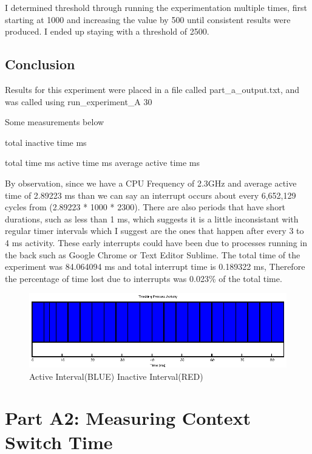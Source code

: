 \documentclass{article}
\begin{document}
I determined threshold through running the experimentation multiple times, first starting at 1000 and increasing the value by 500 until consistent results were produced. I ended up  staying with a threshold of 2500.

\subsection{Conclusion}

Results for this experiment were placed in a file called part\_a\_output.txt, and was called using run\_experiment\_A 30

Some measurements below

total inactive time \- ms 

total time \- ms
active time \- ms
average active time \- ms

By observation, since we have a CPU Frequency of 2.3GHz and average active time of 2.89223 ms than we can say an interrupt occurs about every 6,652,129 cycles from (2.89223 * 1000 * 2300). There are also periods that have short durations, such as less than 1 ms, which suggests it is a little inconsistant with regular timer intervals which I suggest are the ones that happen after every 3 to 4 ms activity. These early interrupts could have been due to processes running in the back such as Google Chrome or Text Editor Sublime.
The total time of the experiment was 84.064094 ms and total interrupt time is 0.189322 ms, Therefore the percentage of time lost due to interrupts was 0.023\% of the total time.

\begin{figure}
\centering
\includegraphics[scale=1.75]{part_a.eps}
\caption{Active \-\> Interval(BLUE) Inactive \-\> Interval(RED)}
\label{fig:parta}
\end{figure}

\section{Part A2: Measuring Context Switch Time}
\end{document}
